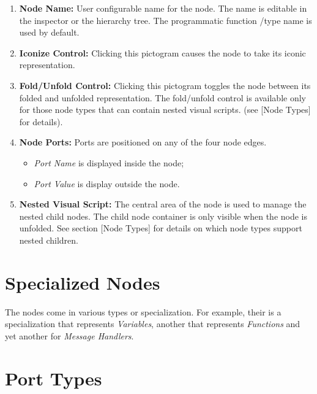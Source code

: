 \begin{enumerate}
\item \textbf{Node Name:} User configurable name for the node. The name is editable in the inspector or the hierarchy tree. The programmatic function \slash  type name is used by default.

\item \textbf{Iconize Control:} Clicking this pictogram causes the node to take its iconic representation.

\item \textbf{Fold\slash Unfold Control:} Clicking this pictogram toggles the node between its folded and unfolded representation. The fold\slash unfold control is available only for those node types that can contain nested visual scripts. (see [Node Types] for details).

\item \textbf{Node Ports:} Ports are positioned on any of the four node edges.

\begin{itemize}
\item \emph{Port Name} is displayed inside the node;

\item \emph{Port Value} is display outside the node.

\end{itemize}

\item \textbf{Nested Visual Script:} The central area of the node is used to manage the nested child nodes. The child node container is only visible when the node is unfolded. See section [Node Types] for details on which node types support nested children.

\end{enumerate}

\chapter{Specialized Nodes}
\label{specializednodes}

The nodes come in various types or specialization. For example, their is a specialization that represents \emph{Variables}, another that represents \emph{Functions} and yet another for \emph{Message Handlers}. 

\chapter{Port Types}
\label{porttypes}

